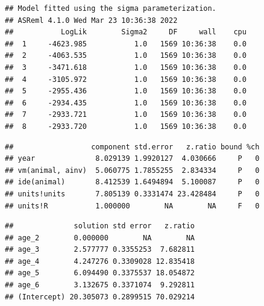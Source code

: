 \documentclass[
  12pt,
]{book}
\newenvironment{Shaded}{\begin{snugshade}}{\end{snugshade}}
\newcommand{\DataTypeTok}[1]{\textcolor[rgb]{0.13,0.29,0.53}{#1}}
\newcommand{\DecValTok}[1]{\textcolor[rgb]{0.00,0.00,0.81}{#1}}
\newcommand{\KeywordTok}[1]{\textcolor[rgb]{0.13,0.29,0.53}{\textbf{#1}}}
\newcommand{\NormalTok}[1]{#1}
\newcommand{\OperatorTok}[1]{\textcolor[rgb]{0.81,0.36,0.00}{\textbf{#1}}}
\newcommand{\OtherTok}[1]{\textcolor[rgb]{0.56,0.35,0.01}{#1}}
\newcommand{\StringTok}[1]{\textcolor[rgb]{0.31,0.60,0.02}{#1}}
\begin{document}
\begin{verbatim}
## Model fitted using the sigma parameterization.
## ASReml 4.1.0 Wed Mar 23 10:36:38 2022
##           LogLik        Sigma2     DF     wall    cpu
##  1     -4623.985           1.0   1569 10:36:38    0.0
##  2     -4063.535           1.0   1569 10:36:38    0.0
##  3     -3471.618           1.0   1569 10:36:38    0.0
##  4     -3105.972           1.0   1569 10:36:38    0.0
##  5     -2955.436           1.0   1569 10:36:38    0.0
##  6     -2934.435           1.0   1569 10:36:38    0.0
##  7     -2933.721           1.0   1569 10:36:38    0.0
##  8     -2933.720           1.0   1569 10:36:38    0.0
\end{verbatim}

\begin{Shaded}
\end{Shaded}

\begin{verbatim}
##                  component std.error   z.ratio bound %ch
## year              8.029139 1.9920127  4.030666     P   0
## vm(animal, ainv)  5.060775 1.7855255  2.834334     P   0
## ide(animal)       8.412539 1.6494894  5.100087     P   0
## units!units       7.805139 0.3331474 23.428484     P   0
## units!R           1.000000        NA        NA     F   0
\end{verbatim}

\begin{Shaded}
\end{Shaded}

\begin{verbatim}
##              solution std error   z.ratio
## age_2        0.000000        NA        NA
## age_3        2.577777 0.3355253  7.682811
## age_4        4.247276 0.3309028 12.835418
## age_5        6.094490 0.3375537 18.054872
## age_6        3.132675 0.3371074  9.292811
## (Intercept) 20.305073 0.2899515 70.029214
\end{verbatim}
\end{document}

